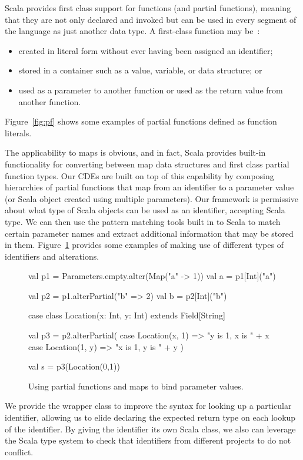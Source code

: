 Scala provides first class support for functions (and partial functions), meaning that they are not only declared and invoked 
but can be used in every segment of the language as just another data type. 
A first-class function may be~\cite{swartz2014learning}:
\begin{itemize}
\item created in literal form without ever having been assigned an identifier;
\item stored in a container such as a value, variable, or data structure; or
\item used as a parameter to another function or used as the return value from another function.
\end{itemize}
Figure~\ref{fig:pf} shows some examples of partial functions defined as function literals.

The applicability to maps is obvious, and in fact, Scala provides built-in functionality for converting between map data structures and first class partial function types.
Our CDEs are built on top of this capability by composing hierarchies of partial functions that map from an identifier
to a parameter value (or Scala object created using multiple parameters).
Our framework is permissive about what type of Scala objects can be used as an identifier, accepting  Scala type.
We can then use the pattern matching tools built in to Scala to match certain parameter names and extract additional information that may be stored in them.
Figure~\ref{fig:paramspf} provides some examples of making use of different types of identifiers and alterations.

\begin{figure}
\centering
\begin{scala}
val p1 = Parameters.empty.alter(Map("a" -> 1))
val a = p1[Int]("a")

val p2 = p1.alterPartial({"b" => 2})
val b = p2[Int]("b")

case class Location(x: Int, y: Int) extends Field[String]

val p3 = p2.alterPartial({
  case Location(x, 1) => "y is 1, x is " + x
  case Location(1, y) => "x is 1, y is " + y
})

val s = p3(Location(0,1))
\end{scala} 
\caption{Using partial functions and maps to bind parameter values.}
\label{fig:paramspf}
\end{figure}

We provide the  wrapper class to improve the syntax for looking up a particular identifier, 
allowing us to elide declaring the expected return type on each lookup of the identifier.
By giving the identifier its own Scala class, we also can leverage the Scala type system to check that identifiers from different projects to do not conflict.

